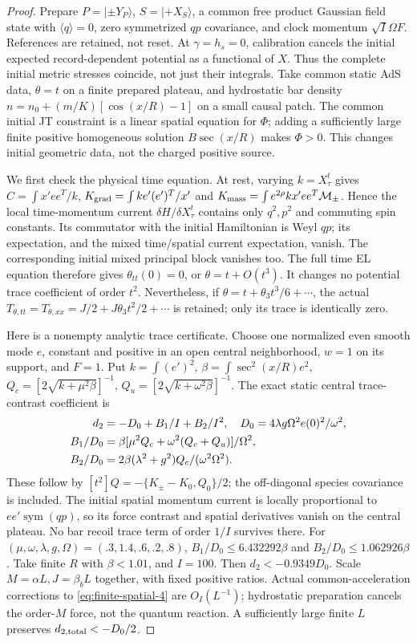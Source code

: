 \documentclass[12pt,a4paper]{article}
\begin{document}
\begin{proof}
Prepare $P=|\pm Y_P\rangle$, $S=|+X_S\rangle$, a common free product
Gaussian field state with $\langle q\rangle=0$, zero symmetrized $qp$
covariance, and clock momentum $\sqrt I\Omega F$. References are
retained, not reset. At $\gamma=h_s=0$, calibration cancels the initial
expected record-dependent potential as a functional of $X$. Thus the
complete initial metric stresses coincide, not just their integrals.
Take common static AdS data, $\theta=t$ on a finite prepared plateau,
and hydrostatic bar density
$n=n_0+(m/K)[\cos(x/R)-1]$ on a small causal patch. The common initial
JT constraint is a linear spatial equation for $\Phi$; adding a
sufficiently large finite positive homogeneous solution
$B\sec(x/R)$ makes $\Phi>0$. This changes initial geometric data, not
the charged positive source.

We first check the physical time equation. At rest, varying
$k=X_\tau^t$ gives $C=\int x'ee^T/k$,
$K_{\rm grad}=\int ke'(e')^T/x'$ and
$K_{\rm mass}=\int e^{2\rho}kx'ee^T\mathcal M_\pm$.
Hence the local time-momentum current $\delta H/\delta X_\tau^t$
contains only $q^2,p^2$ and commuting spin constants. Its commutator
with the initial Hamiltonian is Weyl $qp$; its expectation, and the
mixed time/spatial current expectation, vanish. The corresponding
initial mixed principal block vanishes too. The full time EL equation
therefore gives $\theta_{tt}(0)=0$, or $\theta=t+O(t^3)$.
It changes no potential trace coefficient of order $t^2$.
Nevertheless, if $\theta=t+\theta_3t^3/6+\cdots$, the actual
$T_{\theta,tt}=T_{\theta,xx}=J/2+J\theta_3t^2/2+\cdots$
is retained; only its trace is identically zero.

Here is a nonempty analytic trace certificate. Choose one normalized
even smooth mode $e$, constant and positive in an open central
neighborhood, $w=1$ on its support, and $F=1$. Put
$k=\int(e')^2$, $\beta=\int\sec^2(x/R)e^2$,
$Q_c=[2\sqrt{k+\mu^2\beta}]^{-1}$,
$Q_u=[2\sqrt{k+\omega^2\beta}]^{-1}$.
The exact static central trace-contrast coefficient is
\begin{align}
 d_2&=-D_0+B_1/I+B_2/I^2,\quad
 D_0=4\lambda g\Omega^2e(0)^2/\omega^2,\notag\\
 B_1/D_0&=\beta[\mu^2Q_c+\omega^2(Q_c+Q_u)]/\Omega^2,
 \\
 B_2/D_0&=2\beta(\lambda^2+g^2)Q_c/(\omega^2\Omega^2).       \label{eq:finite-spatial-4}
\end{align}
These follow by $[t^2]Q=-\{K_\pm-K_0,Q_0\}/2$; the off-diagonal
species covariance is included. The initial spatial momentum current
is locally proportional to $ee'\operatorname{sym}(qp)$, so its force
contrast and spatial derivatives vanish on the central plateau. No
bar recoil trace term of order $1/I$ survives there. For
$(\mu,\omega,\lambda,g,\Omega)=(.3,1.4,.6,.2,.8)$,
$B_1/D_0\le6.432292\beta$ and $B_2/D_0\le1.062926\beta$.
Take finite $R$ with $\beta<1.01$, and $I=100$.
Then $d_2<-0.9349D_0$.
Scale $M=\alpha L,J=\beta_bL$ together, with fixed positive ratios.
Actual common-acceleration corrections to \eqref{eq:finite-spatial-4} are $O_I(L^{-1})$;
hydrostatic preparation cancels the order-$M$ force, not the quantum
reaction. A sufficiently large finite $L$ preserves $d_{2,\rm total}<-D_0/2$.


\end{proof}
\end{document}
